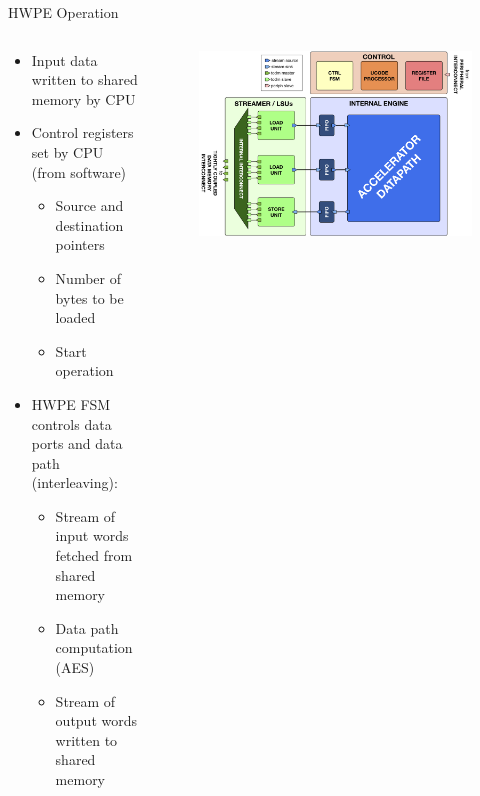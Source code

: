 \documentclass[aspectratio=169, nobackgroundmain]{beamer}
\begin{document}
\begin{frame}[fragile]{HWPE Operation}
  \begin{columns}
    \begin{column}{0.5\textwidth}
      \begin{itemize}
        \item Input data written to shared memory by CPU
        \item Control registers set by CPU (from software) \begin{itemize}
          \item Source and destination pointers
          \item Number of bytes to be loaded
          \item Start operation
        \end{itemize}
        \item HWPE FSM controls data ports and data path (interleaving): \begin{itemize}
          \item Stream of input words fetched from shared memory
          \item Data path computation (AES)
          \item Stream of output words written to shared memory
        \end{itemize}
    \end{itemize}
    \end{column}
    \begin{column}{0.49\textwidth}
        \begin{figure}
            \raggedleft
            \includegraphics[width=1\textwidth]{hwpe.png}
        \end{figure}
    \end{column}
  \end{columns} 
\end{frame}
\end{document}
